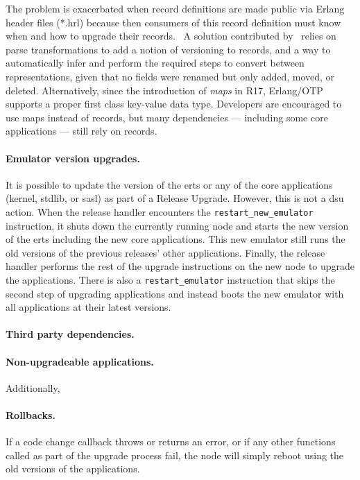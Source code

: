 The problem is exacerbated when record definitions are made public via Erlang header files (*.hrl) because then consumers of this record definition must know when and how to upgrade their records.~\cite{davis:talk} A solution contributed by~\cite{wiger:parsetrans} relies on parse transformations to add a notion of versioning to records, and a way to automatically infer and perform the required steps to convert between representations, given that no fields were renamed but only added, moved, or deleted. Alternatively, since the introduction of \emph{maps} in R17, Erlang/OTP supports a proper first class key-value data type. Developers are encouraged to use maps instead of records, but many dependencies –– including some core applications –– still rely on records.

\paragraph{Emulator version upgrades.} It is possible to update the version of the \acrfull{erts} or any of the core applications (kernel, stdlib, or sasl) as part of a Release Upgrade. However, this is not a \acrshort{dsu} action. When the release handler encounters the \lstinline|restart_new_emulator| instruction, it shuts down the currently running node and starts the new version of the \acrshort{erts} including the new core applications. This new emulator still runs the old versions of the previous releases' other applications. Finally, the release handler performs the rest of the upgrade instructions on the new node to upgrade the applications. There is also a \lstinline|restart_emulator| instruction that skips the second step of upgrading applications and instead boots the new emulator with all applications at their latest versions.

\paragraph{Third party dependencies.}


\paragraph{Non-upgradeable applications.}
Additionally,


\paragraph{Rollbacks.} If a code change callback throws or returns an error, or if any other functions called as part of the upgrade process fail, the node will simply reboot using the old versions of the applications.




